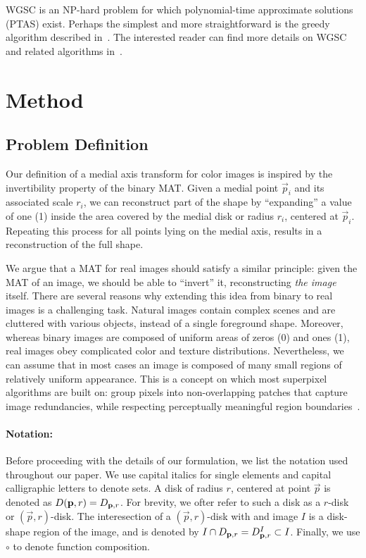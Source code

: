 \documentclass[10pt,twocolumn,letterpaper]{article}
\begin{document}
WGSC is an NP-hard problem for which polynomial-time approximate solutions (PTAS) exist.
Perhaps the simplest and more straightforward is the greedy algorithm described in~\cite{vazirani2013approximation}. 
The interested reader can find more details on WGSC and related algorithms in~\cite{mustafa2015quasi,varadarajan2010weighted,har2012weighted,chan2012weighted}.


\section{Method}\label{sec:method}
\subsection{Problem Definition}\label{sec:definition}
Our definition of a medial axis transform for color images is inspired by the invertibility property of the binary MAT. 
Given a medial point $\vec{p}_i$ and its associated scale $r_i$, we can reconstruct part of the shape by ``expanding'' a value of one (1) inside the area covered by the medial disk or radius $r_i$, centered at $\vec{p}_i$.
Repeating this process for all points lying on the medial axis, results in a reconstruction of the full shape.

We argue that a MAT for real images should satisfy a similar principle: given the MAT of an image, we should be able to ``invert'' it, reconstructing \emph{the image} itself.
There are several reasons why extending this idea from binary to real images is a challenging task. 
Natural images contain complex scenes and are cluttered with various objects, instead of a single foreground shape. 
Moreover, whereas binary images are composed of uniform areas of zeros (0) and ones (1), real images obey complicated color and texture distributions. Nevertheless, we can assume that in most cases an image is composed of many small regions of relatively uniform appearance. This is a concept on which most superpixel algorithms are built on: group pixels into non-overlapping patches that capture image redundancies, while respecting perceptually meaningful region boundaries~\cite{shi2000normalized,levinshtein2009turbopixels,achanta2012slic}. 

\paragraph{Notation:} Before proceeding with the details of our formulation, we list the notation used throughout our paper.
We use capital italics for single elements and capital calligraphic letters to denote sets. A disk of radius $r$, centered at point $\vec{p}$ is denoted as $D(\mathbf{p},r)=D_{\mathbf{p},r}$. For brevity, we ofter refer to such a disk as a $r$-disk or $(\vec{p},r)$-disk.
The interesection of a $(\vec{p},r)$-disk with and image $I$ is a disk-shape region of the image, and is denoted by 
$I \cap D_{\mathbf{p},r}=D_{\mathbf{p},r}^I \subset I$. Finally, we use $\circ$ to denote function composition.
\end{document}
